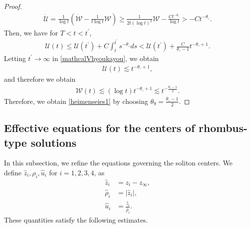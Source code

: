 \documentclass[10pt,a4paper]{amsart}
\numberwithin{equation}{section}
\begin{document}
\begin{proof}
\begin{align}\label{Vupper}
\dot{\mathcal{U}}=\frac{1}{\log{t}}\left(\dot{\mathcal{W}}-\frac{1}{t\log{t}}\mathcal{W}\right)\geq \frac{1}{2t(\log{t})^2}\mathcal{W}-\frac{Ct^{-\theta_{\circ}}}{\log{t}}>-Ct^{-\theta_{\circ}}.
\end{align}
Then, we have for $T<t<t^{\prime}$,
\begin{align}\label{mathcalVhyoukayou}
\mathcal{U}(t)\leq \mathcal{U}(t^{\prime})+C\int_t^{t^{\prime}}s^{-\theta_{\circ}}ds<\mathcal{U}(t^{\prime})+\frac{C}{\theta_{\circ}-1}t^{-\theta_{\circ}+1}.
\end{align}
Letting $t^{\prime}\to\infty$ in \eqref{mathcalVhyoukayou}, we obtain
\begin{align*}
\mathcal{U}(t)\lesssim t^{-\theta_{\circ}+1},
\end{align*}
and therefore we obtain
\begin{align*}
\mathcal{W}(t)\lesssim (\log{t})t^{-\theta_{\circ}+1}\lesssim  t^{-\frac{\theta_{\circ}-1}{2}}.
\end{align*}
Therefore, we obtain \eqref{heimenseies1} by choosing $\theta_9=\frac{\theta_{\circ}-1}{2}$.
\end{proof}





\subsection{Effective equations for the centers of rhombus-type solutions}

In this subsection, we refine the equations governing the soliton centers. We define $\hat{z}_i, \hat{\rho}_i, \hat{u}_i$ for $i=1,2,3,4$, as
\begin{align*}
\hat{z}_i&=z_i-z_{\infty},
\\
\hat{\rho}_i&=\left|\hat{z}_i\right|,
\\
\hat{u}_i&=\frac{\hat{z}_i}{\hat{\rho}_i}.
\end{align*}
These quantities satisfy the following estimates.
\end{document}
